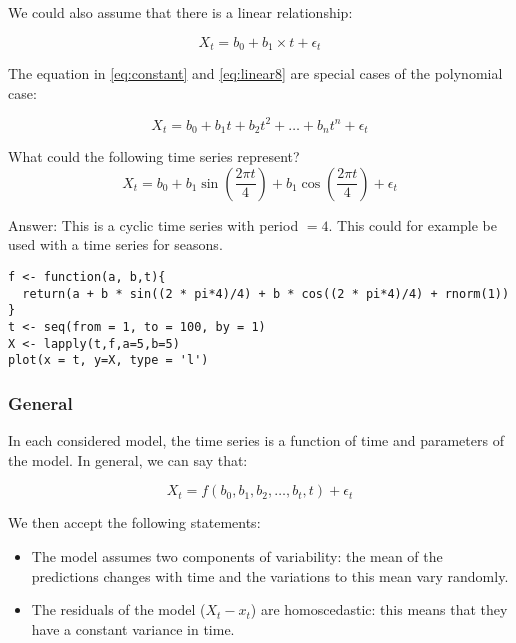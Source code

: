 We could also assume that there is a linear relationship:

\begin{equation}
  X_{t} = b_{0} + b_{1} \times t + \epsilon_{t}
  \label{eq:linear8}
\end{equation}

The equation in \ref{eq:constant} and \ref{eq:linear8} are special cases of the polynomial case:

\begin{equation}
	X_{t} = b_{0} + b_{1} t + b_{2} t^{2} + \dots + b_{n} t^{n} + \epsilon_{t} 
\label{eq:polynomial}
\end{equation}

\begin{exercise}
	What could the following time series represent?
	\begin{equation}
		X_{t} = b_{0} + b_{1} \sin\left(\frac{2\pi t}{4}\right) + b_{1} \cos\left(\frac{2\pi t}{4}\right) + \epsilon_{t}
	\label{eq:seasonal}
\end{equation}
\end{exercise}

Answer: This is a cyclic time series with period $= 4$. This could for example be used with a time series for seasons.

\begin{lstlisting}
f <- function(a, b,t){
  return(a + b * sin((2 * pi*4)/4) + b * cos((2 * pi*4)/4) + rnorm(1))
}
t <- seq(from = 1, to = 100, by = 1)
X <- lapply(t,f,a=5,b=5)
plot(x = t, y=X, type = 'l')
\end{lstlisting}

\subsubsection{General}

In each considered model, the time series is a function of time and parameters of the model. In general, we can say that:

\begin{equation}
	X_{t} = f(b_{0}, b_{1}, b_{2}, \dots , b_{t}, t) + \epsilon_{t}
\label{eq:general}
\end{equation}

We then accept the following statements:

\begin{itemize}
	\item The model assumes two components of variability: the mean of the predictions changes with time and the variations to this mean vary randomly.
	\item The residuals of the model ($X_{t} - x_{t}$) are homoscedastic: this means that they have a constant variance in time.
\end{itemize}

